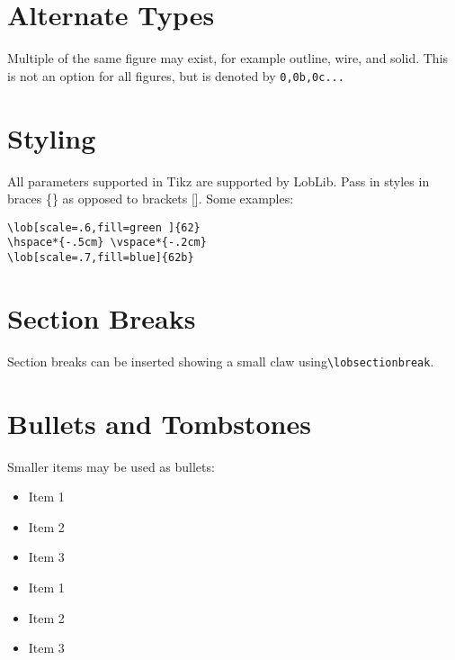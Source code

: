 \documentclass[11pt]{article}
\begin{document}
\section*{Alternate Types}
Multiple of the same figure may exist, for example outline, wire, and solid. This is not an option for all figures, but is denoted by \texttt{0,0b,0c...}\\

\vspace*{1em}




\pagebreak

\section*{Styling}
All parameters supported in Tikz are supported by LobLib. Pass in styles in braces \{\} as opposed to brackets []. Some examples:
\vspace*{1cm}

\begin{multicols}{2}
\begin{verbatim}
\lob[scale=.6,fill=green ]{62}
\hspace*{-.5cm} \vspace*{-.2cm}
\lob[scale=.7,fill=blue]{62b}
\end{verbatim}

\hspace*{-.5cm} \vspace*{-.2cm} 
\end{multicols}

\section*{Section Breaks}
Section breaks can be inserted showing a small claw using\texttt{\textbackslash lobsectionbreak}.

\lobsectionbreak

\section*{Bullets and Tombstones}
Smaller items may be used as bullets:

\begin{multicols}{2}
\begin{itemize}
\item[\lobclaw{simple}] Item 1
\item[\lobclaw{simple}] Item 2
\item[\lobclaw{simple}] Item 3
\end{itemize}

\begin{itemize}
\item[\lob{29}] Item 1
\item[\lob{29}] Item 2
\item[\lob{29}] Item 3
\end{itemize}
\end{multicols}
\end{document}

